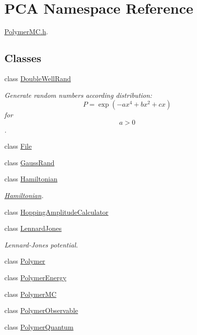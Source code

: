\hypertarget{namespace_p_c_a}{}\section{P\+CA Namespace Reference}
\label{namespace_p_c_a}


\hyperlink{_polymer_m_c_8h}{Polymer\+M\+C.\+h}.  


\subsection*{Classes}
\begin{DoxyCompactItemize}
\item 
class \hyperlink{class_p_c_a_1_1_double_well_rand}{Double\+Well\+Rand}
\begin{DoxyCompactList}\small\item\em Generate random numbers according distribution\+: \[ P = \exp(-ax^4+bx^2+cx) \] for \[ a>0 \]. \end{DoxyCompactList}\item 
class \hyperlink{class_p_c_a_1_1_file}{File}
\item 
class \hyperlink{class_p_c_a_1_1_gauss_rand}{Gauss\+Rand}
\item 
class \hyperlink{class_p_c_a_1_1_hamiltonian}{Hamiltonian}
\begin{DoxyCompactList}\small\item\em \hyperlink{class_p_c_a_1_1_hamiltonian}{Hamiltonian}. \end{DoxyCompactList}\item 
class \hyperlink{class_p_c_a_1_1_hopping_amplitude_calculator}{Hopping\+Amplitude\+Calculator}
\item 
class \hyperlink{class_p_c_a_1_1_lennard_jones}{Lennard\+Jones}
\begin{DoxyCompactList}\small\item\em Lennard-\/\+Jones potential. \end{DoxyCompactList}\item 
class \hyperlink{class_p_c_a_1_1_polymer}{Polymer}
\item 
class \hyperlink{class_p_c_a_1_1_polymer_energy}{Polymer\+Energy}
\item 
class \hyperlink{class_p_c_a_1_1_polymer_m_c}{Polymer\+MC}
\item 
class \hyperlink{class_p_c_a_1_1_polymer_observable}{Polymer\+Observable}
\item 
class \hyperlink{class_p_c_a_1_1_polymer_quantum}{Polymer\+Quantum}
\item 

\end{DoxyCompactItemize}
